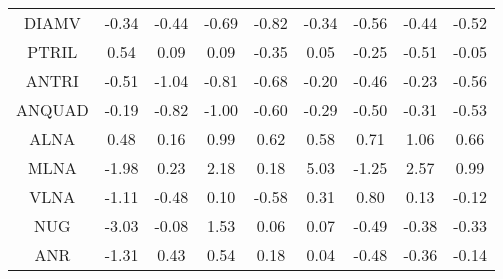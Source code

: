 \documentclass[11pt,a4paper]{report}
\begin{document}
\begin{longtable}{ | c || c | c | c | c | c | c | c || c |}
DIAMV &  \cellcolor[HTML]{FFF7F7} -0.34 &  \cellcolor[HTML]{FFF7F7} -0.44 &  \cellcolor[HTML]{FFEFEF} -0.69 &  \cellcolor[HTML]{FFE7E7} -0.82 &  \cellcolor[HTML]{FFF7F7} -0.34 &  \cellcolor[HTML]{FFEFEF} -0.56 &  \cellcolor[HTML]{FFF7F7} -0.44 &  \cellcolor[HTML]{FFEFEF} -0.52 \\
PTRIL &  \cellcolor[HTML]{EFEFFF} 0.54 &  \cellcolor[HTML]{FFFFFF} 0.09 &  \cellcolor[HTML]{FFFFFF} 0.09 &  \cellcolor[HTML]{FFF7F7} -0.35 &  \cellcolor[HTML]{FFFFFF} 0.05 &  \cellcolor[HTML]{FFF7F7} -0.25 &  \cellcolor[HTML]{FFEFEF} -0.51 &  \cellcolor[HTML]{FFFFFF} -0.05 \\
ANTRI &  \cellcolor[HTML]{FFEFEF} -0.51 &  \cellcolor[HTML]{FFE7E7} -1.04 &  \cellcolor[HTML]{FFE7E7} -0.81 &  \cellcolor[HTML]{FFEFEF} -0.68 &  \cellcolor[HTML]{FFF7F7} -0.20 &  \cellcolor[HTML]{FFF7F7} -0.46 &  \cellcolor[HTML]{FFF7F7} -0.23 &  \cellcolor[HTML]{FFEFEF} -0.56 \\
ANQUAD &  \cellcolor[HTML]{FFF7F7} -0.19 &  \cellcolor[HTML]{FFE7E7} -0.82 &  \cellcolor[HTML]{FFE7E7} -1.00 &  \cellcolor[HTML]{FFEFEF} -0.60 &  \cellcolor[HTML]{FFF7F7} -0.29 &  \cellcolor[HTML]{FFEFEF} -0.50 &  \cellcolor[HTML]{FFF7F7} -0.31 &  \cellcolor[HTML]{FFEFEF} -0.53 \\
ALNA &  \cellcolor[HTML]{EFEFFF} 0.48 &  \cellcolor[HTML]{FFFFFF} 0.16 &  \cellcolor[HTML]{E7E7FF} 0.99 &  \cellcolor[HTML]{EFEFFF} 0.62 &  \cellcolor[HTML]{EFEFFF} 0.58 &  \cellcolor[HTML]{EFEFFF} 0.71 &  \cellcolor[HTML]{E7E7FF} 1.06 &  \cellcolor[HTML]{EFEFFF} 0.66 \\
MLNA &  \cellcolor[HTML]{FFCFCF} -1.98 &  \cellcolor[HTML]{F7F7FF} 0.23 &  \cellcolor[HTML]{C7C7FF} 2.18 &  \cellcolor[HTML]{F7F7FF} 0.18 &  \cellcolor[HTML]{8080FF} 5.03 &  \cellcolor[HTML]{FFDFDF} -1.25 &  \cellcolor[HTML]{BFBFFF} 2.57 &  \cellcolor[HTML]{E7E7FF} 0.99 \\
VLNA &  \cellcolor[HTML]{FFE7E7} -1.11 &  \cellcolor[HTML]{FFEFEF} -0.48 &  \cellcolor[HTML]{FFFFFF} 0.10 &  \cellcolor[HTML]{FFEFEF} -0.58 &  \cellcolor[HTML]{F7F7FF} 0.31 &  \cellcolor[HTML]{E7E7FF} 0.80 &  \cellcolor[HTML]{FFFFFF} 0.13 &  \cellcolor[HTML]{FFFFFF} -0.12 \\
NUG &  \cellcolor[HTML]{FFAFAF} -3.03 &  \cellcolor[HTML]{FFFFFF} -0.08 &  \cellcolor[HTML]{D7D7FF} 1.53 &  \cellcolor[HTML]{FFFFFF} 0.06 &  \cellcolor[HTML]{FFFFFF} 0.07 &  \cellcolor[HTML]{FFEFEF} -0.49 &  \cellcolor[HTML]{FFF7F7} -0.38 &  \cellcolor[HTML]{FFF7F7} -0.33 \\
ANR &  \cellcolor[HTML]{FFDFDF} -1.31 &  \cellcolor[HTML]{F7F7FF} 0.43 &  \cellcolor[HTML]{EFEFFF} 0.54 &  \cellcolor[HTML]{F7F7FF} 0.18 &  \cellcolor[HTML]{FFFFFF} 0.04 &  \cellcolor[HTML]{FFEFEF} -0.48 &  \cellcolor[HTML]{FFF7F7} -0.36 &  \cellcolor[HTML]{FFFFFF} -0.14 \\

\end{longtable}
\end{document}
